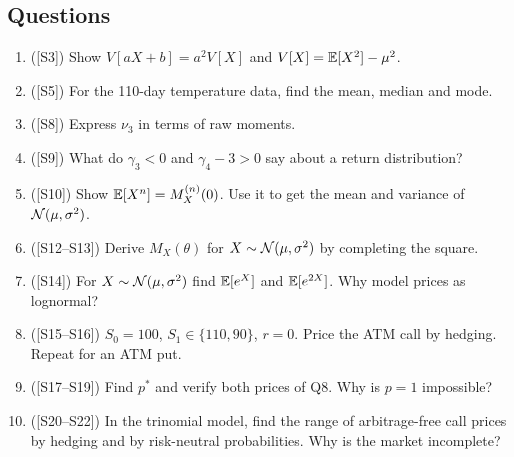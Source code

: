 \documentclass[10pt]{article}
\begin{document}
\subsection*{Questions}
\begin{enumerate}[label=Q\arabic*.]
\item ([S3]) Show $V[aX+b]=a^2V[X]$ and $V[X]=\mathbb{E}[X^2]-\mu^2$.
\item ([S5]) For the 110-day temperature data, find the mean, median and mode.
\item ([S8]) Express $\nu_3$ in terms of raw moments.
\item ([S9]) What do $\gamma_3<0$ and $\gamma_4-3>0$ say about a return distribution?
\item ([S10]) Show $\mathbb{E}[X^n]=M^{(n)}_X(0)$. Use it to get the mean and variance of $\mathcal{N}(\mu,\sigma^2)$.
\item ([S12--S13]) Derive $M_X(\theta)$ for $X\sim\mathcal{N}(\mu,\sigma^2)$ by completing the square.
\item ([S14]) For $X\sim\mathcal{N}(\mu,\sigma^2)$ find $\mathbb{E}[e^X]$ and $\mathbb{E}[e^{2X}]$. Why model prices as lognormal?
\item ([S15--S16]) $S_0=100$, $S_1\in\{110,90\}$, $r=0$. Price the ATM call by hedging. Repeat for an ATM put.
\item ([S17--S19]) Find $p^*$ and verify both prices of Q8. Why is $p=1$ impossible?
\item ([S20--S22]) In the trinomial model, find the range of arbitrage-free call prices by hedging and by risk-neutral probabilities. Why is the market incomplete?
\end{enumerate}
\end{document}
